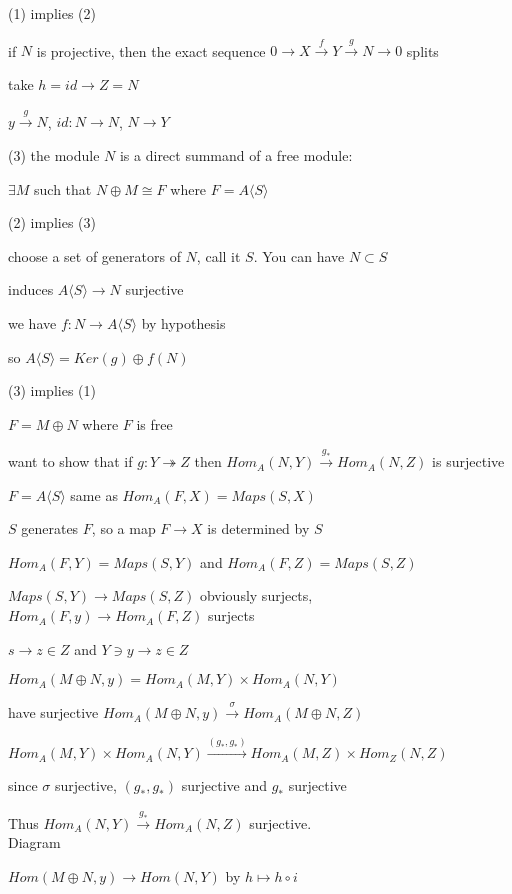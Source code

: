 \documentclass[12pt]{article}
\begin{document}
\noindent
(1) implies (2)

if $N$ is projective, then the exact sequence $0 \to X \xrightarrow{f} Y \xrightarrow{g} N \to 0$ splits

take $h = id \to Z = N$

$y \xrightarrow{g} N$, $id: N \to N$, $N \to Y$

\noindent
(3) the module $N$ is a direct summand of a free module:

$\exists M$ such that $N \oplus M \cong F$ where $F = A\langle S \rangle$

\noindent
(2) implies (3)

choose a set of generators of $N$, call it $S$.  You can have $N \subset S$

induces $A\langle S \rangle \to N$ surjective

we have $f: N \to A\langle S\rangle$ by hypothesis

so $A\langle S\rangle = Ker(g) \oplus f(N)$

\noindent
(3) implies (1)

$F = M \oplus N$ where $F$ is free

want to show that if $g: Y \twoheadrightarrow Z$ then $Hom_A(N, Y) \xrightarrow{g_*} Hom_A(N, Z)$ is surjective

$F = A\langle S \rangle$ same as $Hom_A(F, X) = Maps(S, X)$

$S$ generates $F$, so a map $F \to X$ is determined by $S$

$Hom_A(F, Y) = Maps(S, Y)$ and $Hom_A(F, Z) = Maps(S, Z)$

$Maps(S, Y) \to Maps(S, Z)$ obviously surjects, $Hom_A(F, y) \to Hom_A(F, Z)$ surjects

$s \to z \in Z$ and $Y \ni y \to z \in Z$

$Hom_A(M \oplus N, y) = Hom_A(M, Y) \times Hom_A(N, Y)$

have surjective $Hom_A(M \oplus N, y) \xrightarrow{\sigma} Hom_A(M \oplus N, Z)$

$Hom_A(M, Y) \times Hom_A(N, Y) \xrightarrow{(g_*, g_*)} Hom_A(M, Z) \times Hom_Z(N, Z)$

since $\sigma$ surjective, $(g_*, g_*)$ surjective and $g_*$ surjective

Thus $Hom_A(N, Y) \xrightarrow{g_*} Hom_A(N, Z)$ surjective.\\

\noindent
Diagram

$Hom(M \oplus N, y) \to Hom(N, Y)$ by $h \mapsto h \circ i$
\end{document}
